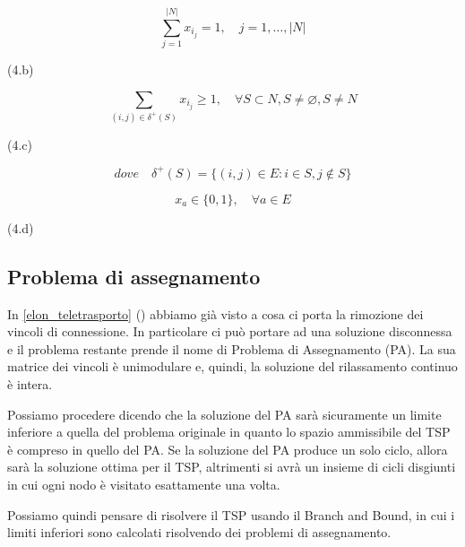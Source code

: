 \begin{minipage}[t]{0.9\textwidth}
\[
\sum_{j = 1}^{|N|} x_{i_j} = 1, \quad  j = 1, \dots, |N|
\]
\end{minipage}%
\begin{minipage}[t]{0.1\textwidth}
\vspace{0,4cm}
(4.b)
\end{minipage}

\begin{minipage}[t]{0.9\textwidth}
\[
\sum_{(i, j) \in \delta^{+}(S)}  x_{i_j} \geq 1, \quad \forall S \subset N, S \ne \varnothing, S \ne N
\]
\end{minipage}%
\begin{minipage}[t]{0.1\textwidth}
\vspace{0,2cm}
(4.c)
\end{minipage}

\[
dove \quad \delta^{+}(S) = \{ (i,j) \in E: i \in S, j \notin S \}
\]

\begin{minipage}[t]{0.9\textwidth}
\[
x_a \in \{0, 1\}, \quad \forall a \in E
\]
\end{minipage}%
\begin{minipage}[t]{0.1\textwidth}
\vspace{0,1cm}
(4.d)
\end{minipage}

\subsection{Problema di assegnamento}
In \ref{elon_teletrasporto} () abbiamo già visto a cosa ci porta la rimozione dei vincoli di connessione. In particolare ci può portare ad una soluzione disconnessa e il problema restante prende il nome di Problema di Assegnamento (PA). La sua matrice dei vincoli è unimodulare e, quindi, la soluzione del rilassamento continuo è intera.

Possiamo procedere dicendo che la soluzione del PA sarà sicuramente un limite inferiore a quella del problema originale in quanto lo spazio ammissibile del TSP è compreso in quello del PA. Se la soluzione del PA produce un solo ciclo, allora sarà la soluzione ottima per il TSP, altrimenti si avrà un insieme di cicli disgiunti in cui ogni nodo è visitato esattamente una volta.

Possiamo quindi pensare di risolvere il TSP usando il Branch and Bound, in cui i limiti inferiori sono calcolati risolvendo dei problemi di assegnamento. 

